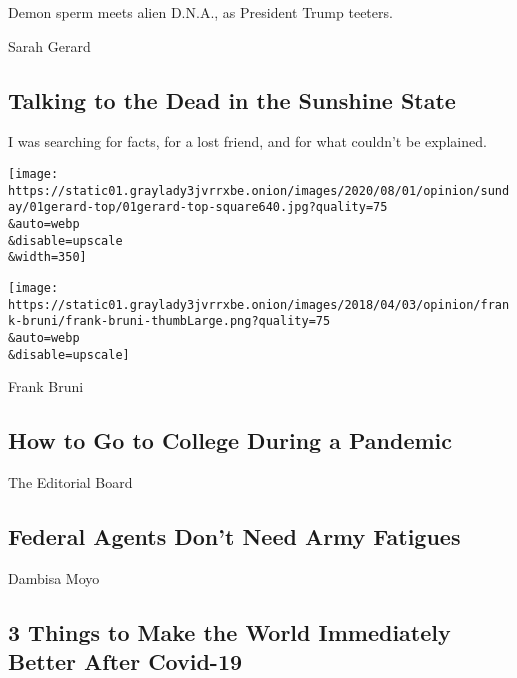 Demon sperm meets alien D.N.A., as President Trump teeters.

\href{/2020/08/01/opinion/spiritualism-cassadaga-florida.html}{}

Sarah Gerard

\hypertarget{talking-to-the-dead-in-the-sunshine-state}{%
\subsection{Talking to the Dead in the Sunshine
State}\label{talking-to-the-dead-in-the-sunshine-state}}

I was searching for facts, for a lost friend, and for what couldn't be
explained.

\href{/2020/08/01/opinion/spiritualism-cassadaga-florida.html}{}

\texttt{[image: https://static01.graylady3jvrrxbe.onion/images/2020/08/01/opinion/sunday/01gerard-top/01gerard-top-square640.jpg?quality=75\\\&auto=webp\\\&disable=upscale\\\&width=350]}

\href{/2020/08/01/opinion/minerva-college-coronavirus.html}{}

\texttt{[image: https://static01.graylady3jvrrxbe.onion/images/2018/04/03/opinion/frank-bruni/frank-bruni-thumbLarge.png?quality=75\\\&auto=webp\\\&disable=upscale]}

Frank Bruni

\hypertarget{how-to-go-to-college-during-a-pandemic}{%
\subsection{How to Go to College During a
Pandemic}\label{how-to-go-to-college-during-a-pandemic}}

\href{/2020/07/31/opinion/federal-agents-trump-uniforms.html}{}

The Editorial Board

\hypertarget{federal-agents-dont-need-army-fatigues}{%
\subsection{Federal Agents Don't Need Army
Fatigues}\label{federal-agents-dont-need-army-fatigues}}

\href{/2020/07/31/opinion/coronavirus-economy.html}{}

Dambisa Moyo

\hypertarget{3-things-to-make-the-world-immediately-better-after-covid-19}{%
\subsection{3 Things to Make the World Immediately Better After
Covid-19}\label{3-things-to-make-the-world-immediately-better-after-covid-19}}

